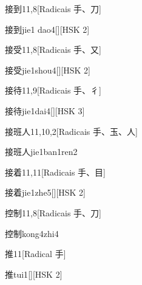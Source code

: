 \begin{entry}{接到}{11,8}[Radicais ⼿、⼑]
  \begin{phonetics}{接到}{jie1 dao4}[][HSK 2]
  \end{phonetics}
\end{entry}

\begin{entry}{接受}{11,8}[Radicais ⼿、⼜]
  \begin{phonetics}{接受}{jie1shou4}[][HSK 2]
  \end{phonetics}
\end{entry}

\begin{entry}{接待}{11,9}[Radicais ⼿、⼻]
  \begin{phonetics}{接待}{jie1dai4}[][HSK 3]
  \end{phonetics}
\end{entry}

\begin{entry}{接班人}{11,10,2}[Radicais ⼿、⽟、⼈]
  \begin{phonetics}{接班人}{jie1ban1ren2}
  \end{phonetics}
\end{entry}

\begin{entry}{接着}{11,11}[Radicais ⼿、⽬]
  \begin{phonetics}{接着}{jie1zhe5}[][HSK 2]
  \end{phonetics}
\end{entry}

\begin{entry}{控制}{11,8}[Radicais ⼿、⼑]
  \begin{phonetics}{控制}{kong4zhi4}
  \end{phonetics}
\end{entry}

\begin{entry}{推}{11}[Radical ⼿]
  \begin{phonetics}{推}{tui1}[][HSK 2]
  \end{phonetics}
\end{entry}

